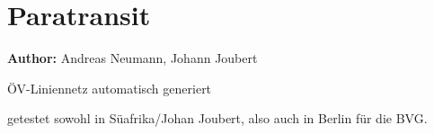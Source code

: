 
\section{Paratransit}
\label{sec:paratransit}
\hfill \textbf{Author:} Andreas Neumann, Johann Joubert

\citet[][]{Neumann_PhDThesis_2014}
ÖV-Liniennetz automatisch generiert 

getestet sowohl in Süafrika/Johan Joubert, also auch in Berlin für die BVG.










